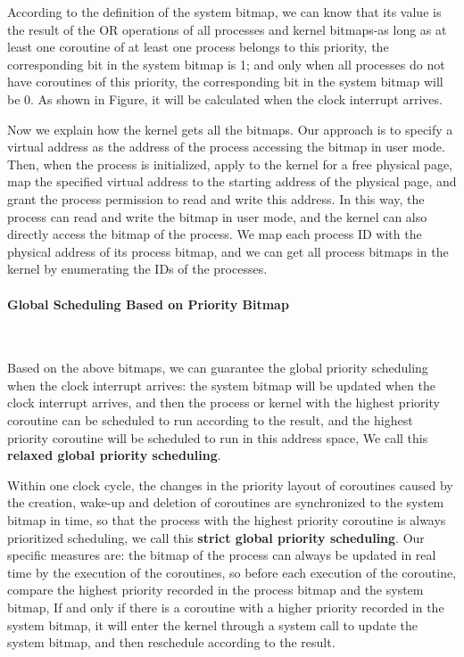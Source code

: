 \documentclass[10pt]{article}
\begin{document}
According to the definition of the system bitmap, we can know that its value is the result of the OR operations of all processes and kernel bitmaps-as long as at least one coroutine of at least one process belongs to this priority, the corresponding bit in the system bitmap is 1; and only when all processes do not have coroutines of this priority, the corresponding bit in the system bitmap will be 0. As shown in Figure, it will be calculated when the clock interrupt arrives.

Now we explain how the kernel gets all the bitmaps. Our approach is to specify a virtual address as the address of the process accessing the bitmap in user mode. Then, when the process is initialized, apply to the kernel for a free physical page, map the specified virtual address to the starting address of the physical page, and grant the process permission to read and write this address. In this way, the process can read and write the bitmap in user mode, and the kernel can also directly access the bitmap of the process. We map each process ID with the physical address of its process bitmap, and we can get all process bitmaps in the kernel by enumerating the IDs of the processes.


\paragraph{Global Scheduling Based on Priority Bitmap}~{}

Based on the above bitmaps, we can guarantee the global priority scheduling when the clock interrupt arrives: the system bitmap will be updated when the clock interrupt arrives, and then the process or kernel with the highest priority coroutine can be scheduled to run according to the result, and the highest priority coroutine will be scheduled to run in this address space, We call this \textbf{relaxed global priority scheduling}.

Within one clock cycle, the changes in the priority layout of coroutines caused by the creation, wake-up and deletion of coroutines are synchronized to the system bitmap in time, so that the process with the highest priority coroutine is always prioritized scheduling, we call this \textbf{strict global priority scheduling}.  Our specific measures are: the bitmap of the process can always be updated in real time by the execution of the coroutines, so before each execution of the coroutine, compare the highest priority recorded in the process bitmap and the system bitmap, If and only if there is a coroutine with a higher priority recorded in the system bitmap, it will enter the kernel through a system call to update the system bitmap, and then reschedule according to the result.
\end{document}

